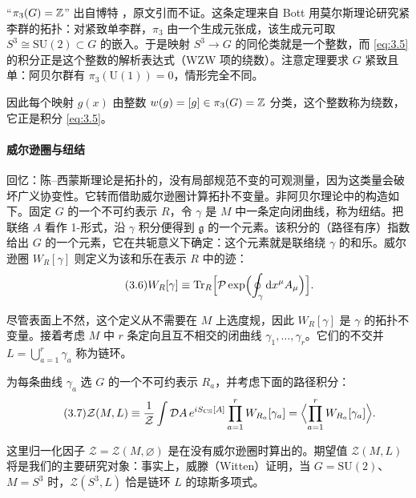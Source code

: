 \begin{yizhu}[含糊点]
“$\pi_3(G)=\mathbb{Z}$” 出自博特 \cite{bott1956}，原文引而不证。这条定理来自 Bott 用莫尔斯理论研究紧李群的拓扑：对紧致单李群，$\pi_3$ 由一个生成元张成，该生成元可取 $S^3\cong\mathrm{SU}(2)\subset G$ 的嵌入。于是映射 $S^3\to G$ 的同伦类就是一个整数，而 \eqref{eq:3.5} 的积分正是这个整数的解析表达式（WZW 项的绕数）。注意定理要求 $G$ 紧致且单：阿贝尔群有 $\pi_3(\mathrm{U}(1))=0$，情形完全不同。
\end{yizhu}

因此每个映射 $g(x)$ 由整数 $w(g)=[g]\in\pi_3(G)=\mathbb{Z}$ 分类，这个整数称为绕数，它正是积分 \eqref{eq:3.5}。

\paragraph{威尔逊圈与纽结}
回忆：陈--西蒙斯理论是拓扑的，没有局部规范不变的可观测量，因为这类量会破坏广义协变性。它转而借助威尔逊圈计算拓扑不变量。非阿贝尔理论中的构造如下。固定 $G$ 的一个不可约表示 $R$，令 $\gamma$ 是 $M$ 中一条定向闭曲线，称为纽结。把联络 $A$ 看作 1-形式，沿 $\gamma$ 积分便得到 $\mathfrak{g}$ 的一个元素。该积分的（路径有序）指数给出 $G$ 的一个元素，它在共轭意义下确定：这个元素就是联络绕 $\gamma$ 的和乐。威尔逊圈 $W_R[\gamma]$ 则定义为该和乐在表示 $R$ 中的迹：
\begin{equation}\tag{3.6}\label{eq:3.6}
  W_R[\gamma] \equiv \operatorname{Tr}_R\Bigl[\mathcal{P}\exp\Bigl(\oint_\gamma \mathrm{d} x^\mu A_\mu\Bigr)\Bigr].
\end{equation}

尽管表面上不然，这个定义从不需要在 $M$ 上选度规，因此 $W_R[\gamma]$ 是 $\gamma$ 的拓扑不变量。接着考虑 $M$ 中 $r$ 条定向且互不相交的闭曲线 $\gamma_1,\dots,\gamma_r$。它们的不交并 $L=\bigcup_{a=1}^r\gamma_a$ 称为链环。

为每条曲线 $\gamma_a$ 选 $G$ 的一个不可约表示 $R_a$，并考虑下面的路径积分：
\begin{equation}\tag{3.7}\label{eq:3.7}
  \mathcal{Z}(M,L) \equiv \frac{1}{\mathcal{Z}}\int\mathcal{D}A\,e^{iS_{\mathrm{CS}}[A]}\prod_{a=1}^{r}W_{R_a}[\gamma_a]
  = \Bigl\langle\prod_{a=1}^{r}W_{R_a}[\gamma_a]\Bigr\rangle.
\end{equation}

这里归一化因子 $\mathcal{Z}=\mathcal{Z}(M,\varnothing)$ 是在没有威尔逊圈时算出的。期望值 $\mathcal{Z}(M,L)$ 将是我们的主要研究对象：事实上，威滕（Witten）证明，当 $G=\mathrm{SU}(2)$、$M=S^3$ 时，$\mathcal{Z}(S^3,L)$ 恰是链环 $L$ 的琼斯多项式。

